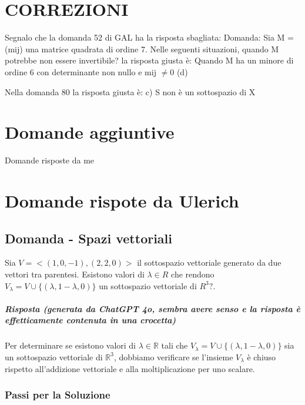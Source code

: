\documentclass[12pt, a4paper, openany]{book}
\begin{document}
\chapter{CORREZIONI}
Segnalo che la domanda 52 di GAL ha la risposta sbagliata:
Domanda: Sia M = (mij) una matrice quadrata di ordine 7. Nelle seguenti situazioni, quando M potrebbe non essere invertibile?
la risposta giusta è: Quando M ha un minore di ordine 6 con determinante non nullo e mij $\neq 0$ (d)

Nella domanda 80 la risposta giusta è: c) S non è un sottospazio di X

\chapter{Domande aggiuntive} 
Domande risposte da me

\chapter{Domande rispote da Ulerich}
\section{Domanda - Spazi vettoriali}
Sia $V = <(1,0,-1),(2,2,0)>$ il sottospazio vettoriale generato da due vettori tra parentesi. Esistono valori di $\lambda \in R$ che rendono 
$V_{\lambda} = V \cup \{(\lambda, 1 - \lambda, 0)\}$ un sottospazio vettoriale di $R^3?$.
\paragraph*{Risposta (generata da ChatGPT 4o, sembra avere senso e la risposta è effetticamente contenuta in una crocetta)}
Per determinare se esistono valori di \( \lambda \in \mathbb{R} \) tali che \( V_{\lambda} = V \cup \{(\lambda, 1 - \lambda, 0)\} \) sia un sottospazio vettoriale di \( \mathbb{R}^3 \), dobbiamo verificare se l'insieme \( V_{\lambda} \) è chiuso rispetto all'addizione vettoriale e alla moltiplicazione per uno scalare.\\
\subsection{Passi per la Soluzione}
\end{document}
